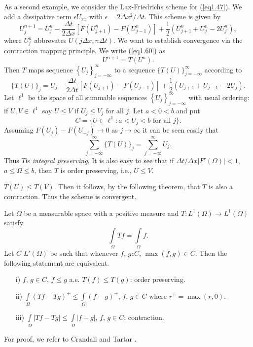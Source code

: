 As a second example, we consider the Lax-Friedrichs scheme for (\ref{eq1.47}). We add a dissipative term $\epsilon U_{xx}$ with $\epsilon = 2\Delta x^2 / \Delta t$. This scheme is given by 
\begin{equation*}
U^{n+1}_j = U^n_j - \frac{\Delta t}{2 \Delta x} [F(U^n_{j+1}) - F (U^n_{j-1})] + \frac{1}{2} (U^n_{j+1} + U^n_{j} - 2U^n_j),  \tag{1.60}\label{eq1.60}
\end{equation*}
where $U^n_j$ abbrevates $U(j\Delta x, n \Delta t)$. We want to establish convergence via the contraction mapping principle. We write (\ref{eq1.60}) as 
\begin{equation*}
U^{n+1} = T(U^n). \tag*{$(1.60)'$}\label{eq1.60'}
\end{equation*}
Then $T$ maps sequence $\left\{U_j \right\}^\infty_{j = - \infty}$ to a sequence $\Big\{T (U) \Big\}^\infty_{j = - \infty}$ according to 
$$
\{T(U)\}_j = U_j - \frac{\Delta t}{2 \Delta t} [F(U_{j+1}) - F(U_{j-1})] + \frac{1}{2} (U_{j+1} + U_{j-1} - 2U_j). 
$$
Let $\ell^1$ be the space of all summable sequences $\left\{U_j \right\}^\infty_{j=-\infty}$ with usual ordering: if $U, V \in \ell^1$ say $U \leq V$ if $U_j \leq V_j$ for all $j$. Let $a < 0 < b$ and put
$$
C = \{U \in \ell^1 : a < U_j <b \text{ for all } j\}.  
$$
Assuming $F(U_j) - F(U_{-j}) \to 0 $ as $j \to \infty$ it can be seen easily that 
$$
\sum\limits^\infty_{j=-\infty} \{T(U)\}_j = \sum\limits^\infty_{j=-\infty} U_j.  
$$
Thus $T$\pageoriginale is {\em integral preserving}. It is also easy to see that if $\Delta t/\Delta x |F' (\Omega)| < 1$, $a \leq \Omega \leq b$, then $T$ is order preserving, i.e., $U \leq V$.

$T (U) \leq T(V)$. Then it follows, by the following theorem, that $T$ is also a contraction. Thus the scheme is convergent.

\begin{theorem*}
Let $\Omega$ be a measurable space with a positive  measure and $T: L^1 (\Omega) \to L^1(\Omega)$ satisfy
$$
\int\limits_\Omega Tf = \int\limits_\Omega f.
$$
Let $C$ $L'(\Omega)$ be such that whenever $f$, $g \epsilon C$, $\max (f,g) \in C$. Then the following statement are equivalent.
\begin{itemize}
\item[{\rm i)}] $f$, $g\in C$, $f \leq g$ a.e. $T(f) \leq T(g)$: order preserving. 

\item[{\rm ii)}] $\int\limits_\Omega (Tf - Tg)^+ \leq \int\limits_\Omega (f-g)^+$, $f$, $g \in C$ where $r^+ = \max (r,0)$.

\item[{\rm iii)}] $\int\limits_\Omega |Tf - Tg| \leq \int\limits_{\Omega} |f-g|$, $f$, $g \in C$: contraction.
\end{itemize}
\end{theorem*}

For proof, we refer to Crandall and Tartar \cite{key7}.
